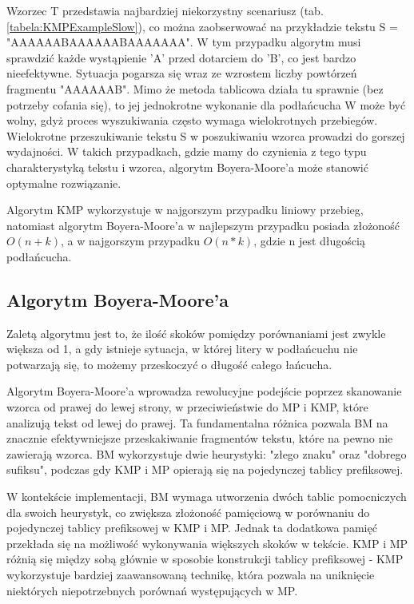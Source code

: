 Wzorzec T przedstawia najbardziej niekorzystny scenariusz 
(tab. \ref{tabela:KMPExampleSlow}), co można zaobserwować na przykładzie tekstu 
S = "AAAAAABAAAAAABAAAAAAA". W tym przypadku algorytm musi sprawdzić każde
wystąpienie 'A' przed dotarciem do 'B', co jest bardzo nieefektywne. Sytuacja 
pogarsza się wraz ze wzrostem liczby powtórzeń fragmentu "AAAAAAB". Mimo że 
metoda tablicowa działa tu sprawnie (bez potrzeby cofania się), to jej 
jednokrotne wykonanie dla podłańcucha W może być wolny, gdyż proces
wyszukiwania często wymaga wielokrotnych przebiegów. Wielokrotne przeszukiwanie
tekstu S w poszukiwaniu wzorca prowadzi do gorszej wydajności. W takich 
przypadkach, gdzie mamy do czynienia z tego typu charakterystyką tekstu 
i wzorca, algorytm Boyera-Moore'a może stanowić optymalne rozwiązanie.

Algorytm KMP wykorzystuje w najgorszym przypadku liniowy przebieg, natomiast
algorytm Boyera-Moore'a w najlepszym przypadku posiada złożoność $O(n+k)$, a w 
najgorszym przypadku $O(n*k)$, gdzie n jest długością podłańcucha.

\subsection{Algorytm Boyera-Moore'a}
\label{sch:algoBoyerMoore}

Zaletą algorytmu jest to, że ilość skoków pomiędzy porównaniami jest zwykle 
większa od 1, a gdy istnieje sytuacja, w której litery w podłańcuchu nie
potwarzają się, to możemy przeskoczyć o długość całego łańcucha.

Algorytm Boyera-Moore'a wprowadza rewolucyjne podejście poprzez skanowanie 
wzorca od prawej do lewej strony, w przeciwieństwie do MP i KMP, które 
analizują tekst od lewej do prawej. Ta fundamentalna różnica pozwala BM na 
znacznie efektywniejsze przeskakiwanie fragmentów tekstu, które na pewno nie 
zawierają wzorca. BM wykorzystuje dwie heurystyki: "złego znaku" oraz "dobrego
sufiksu", podczas gdy KMP i MP opierają się na pojedynczej tablicy prefiksowej.

W kontekście implementacji, BM wymaga utworzenia dwóch tablic pomocniczych dla
swoich heurystyk, co zwiększa złożoność pamięciową w porównaniu do pojedynczej 
tablicy prefiksowej w KMP i MP. Jednak ta dodatkowa pamięć przekłada się na 
możliwość wykonywania większych skoków w tekście. KMP i MP różnią się między 
sobą głównie w sposobie konstrukcji tablicy prefiksowej - KMP wykorzystuje 
bardziej zaawansowaną technikę, która pozwala na uniknięcie niektórych 
niepotrzebnych porównań występujących w MP.

